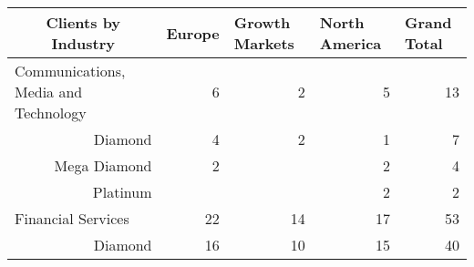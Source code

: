 \begin{table}[]
\caption{}
\label{tab:by_industry}
\begin{tabular}{@{}r|rrrr@{}}
\multicolumn{1}{c|}{\textbf{Clients by Industry}}           & \multicolumn{1}{l}{\cellcolor[HTML]{FFFFFF}Europe} & \multicolumn{1}{l}{\cellcolor[HTML]{FFFFFF}Growth   Markets} & \multicolumn{1}{l}{\cellcolor[HTML]{FFFFFF}North   America} & \multicolumn{1}{l}{\cellcolor[HTML]{FFFFFF}Grand   Total} \\ \midrule
\multicolumn{1}{l|}{Communications, Media and   Technology} & 6                                                  & 2                                                            & 5                                                           & 13                                                        \\
Diamond                                                     & 4                                                  & 2                                                            & 1                                                           & 7                                                         \\
Mega Diamond                                                & 2                                                  &                                                              & 2                                                           & 4                                                         \\
Platinum                                                    &                                                    &                                                              & 2                                                           & 2                                                         \\
\multicolumn{1}{l|}{Financial Services}                     & 22                                                 & 14                                                           & 17                                                          & 53                                                        \\
Diamond                                                     & 16                                                 & 10                                                           & 15                                                          & 40                                                        \\

\end{tabular}
\end{table}
